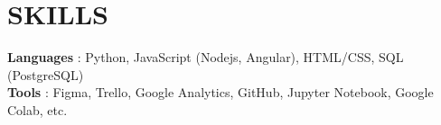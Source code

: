 \documentclass[letterpaper,11pt]{article}
\begin{document}
%
\section{SKILLS}
 \begin{itemize}[leftmargin=0in, label={}]
    \small{\item{
     \textbf{Languages} {: Python, JavaScript (Nodejs, Angular), HTML/CSS, SQL (PostgreSQL)}\vspace{2pt} \\
     \textbf{Tools}     {: Figma, Trello, Google Analytics, GitHub, Jupyter Notebook, Google Colab, etc.}
    }}
 \end{itemize}


\end{document}
